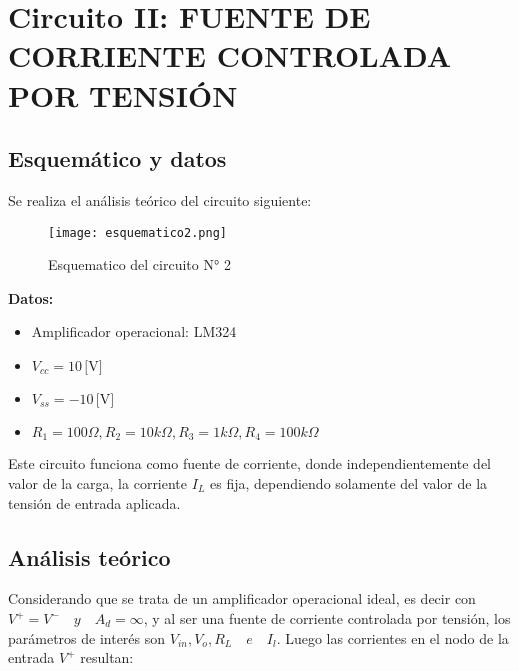 %
 \section{Circuito II:  FUENTE DE CORRIENTE CONTROLADA POR TENSIÓN }

\subsection{Esquemático y datos}
Se realiza el análisis teórico del circuito siguiente: 

  \begin{figure}[h!]
     \centering
	 \texttt{[image: esquematico2.png]}
	 \caption{Esquematico del circuito N° 2}
	 \label{fig:esquematico2}
  \end{figure}
  
  \vspace{1em}
\textbf{Datos:}

\begin{itemize}
  \item Amplificador operacional: LM324
  \item $V_{cc} = 10 \, \text{[V]}$
  \item $V_{ss} = -10 \, \text{[V]}$
  \item $R_1 = 100 \Omega, R_2 = 10k \Omega , R_3 = 1k \Omega , R_4 = 100k \Omega $
\end{itemize}

Este circuito funciona como fuente de corriente, donde independientemente del valor de la carga, la corriente $I_L$ es fija, 
dependiendo solamente del valor de la tensión de entrada aplicada.

\subsection{Análisis teórico}

Considerando que se trata de un amplificador operacional ideal, es decir con $V^+=V^- \quad y \quad A_d = \infty $, y al ser una fuente de corriente controlada
por tensión, los parámetros de interés son $V_{in}, V_o, R_L \quad e \quad I_l$. Luego las corrientes en el nodo de la entrada $V^+$ resultan:

